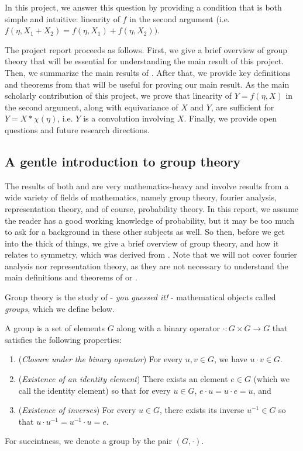 In this project, we answer this question by providing a condition that is both simple and intuitive: linearity of $f$ in the second argument (i.e. $f(\eta, X_1 + X_2) = f(\eta, X_1) + f(\eta, X_2))$.

The project report proceeds as follows.
First, we give a brief overview of group theory that will be essential for understanding the main result of this project.
Then, we summarize the main results of \cite{bloemreddy2019probabilistic}.
After that, we provide key definitions and theorems from \cite{kondor2018generalization} that will be useful for proving our main result.
As the main scholarly contribution of this project, we prove that linearity of $Y = f(\eta,X)$ in the second argument, along with equivariance of $X$ and $Y$, are sufficient for $Y = X * \chi(\eta)$, i.e. $Y$ is a convolution involving $X$.
Finally, we provide open questions and future research directions.

\subsection{A gentle introduction to group theory}
The results of both \cite{bloemreddy2019probabilistic} and \cite{kondor2018generalization} are very mathematics-heavy and involve results from a wide variety of fields of mathematics, namely group theory, fourier analysis, representation theory, and of course, probability theory.
In this report, we assume the reader has a good working knowledge of probability, but it may be too much to ask for a background in these other subjects as well.
So then, before we get into the thick of things, we give a brief overview of group theory, and how it relates to symmetry, which was derived from \cite{RomanSteven2012FoGT}.
Note that we will not cover fourier analysis nor representation theory, as they are not necessary to understand the main definitions and theorems of \cite{bloemreddy2019probabilistic} or \cite{kondor2018generalization}.

Group theory is the study of - \textit{you guessed it!} - mathematical objects called \textit{groups}, which we define below.

\begin{definition} \label{def:group}
A group is a set of elements $G$ along with a binary operator $\cdot : G \times G \to G$ that satisfies the following properties:
\begin{enumerate}[label=(\alph*)]
	\item
	(\textit{Closure under the binary operator})
	For every $u,v \in G$, we have $u \cdot v \in G$.
	\item
	(\textit{Existence of an identity element})
	There exists an element $e \in G$ (which we call the identity element) so that for every $u \in G$, $e \cdot u = u \cdot e = u$, and
	\item
	(\textit{Existence of inverses})
	For every $u \in G$, there exists its inverse $u^{-1} \in G$ so that $u \cdot u^{-1} = u^{-1} \cdot u = e$.
\end{enumerate}
For succintness, we denote a group by the pair $(G,\cdot)$.
\end{definition}

